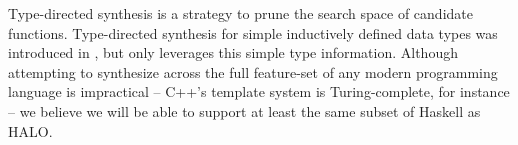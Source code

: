 Type-directed synthesis is a strategy to prune the search space of candidate functions. Type-directed synthesis for simple inductively defined data types was introduced in \cite{poseraZ15}, but only leverages this simple type information. Although attempting to synthesize across the full feature-set of any modern programming language is impractical  -- C++'s template system is Turing-complete, for instance -- we believe we will be able to support at least the same subset of Haskell as HALO.
\fi
